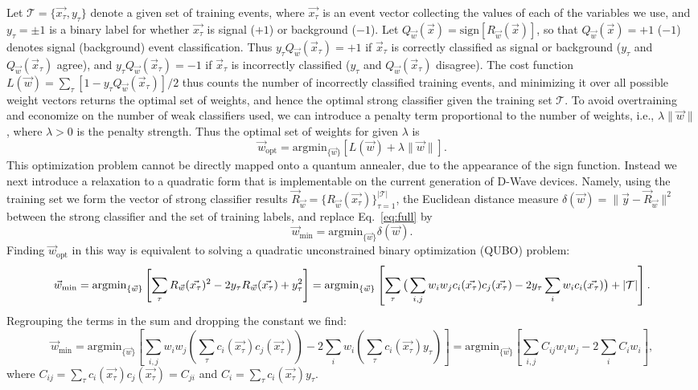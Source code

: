\documentclass[fleqn,10pt]{wlscirep}
\newcommand{\beq}{\begin{equation}}
\newcommand{\eeq}{\end{equation}}
\newcommand{\mc}{\mathcal}
\begin{document}
Let $\mc{T} = \{\vec{x_\tau}, y_\tau\}$ denote a given set of training events, where $\vec{x_\tau}$ is an event vector collecting the values of each of the variables we use, and $y_\tau =\pm 1$ is a binary label for whether $\vec{x_\tau}$ is signal ($+1$) or background ($-1$). Let $Q_{\vec{w}}(\vec{x}) = \mathrm{sign}[R_{\vec{w}}(\vec{x})]$, so that $Q_{\vec{w}}(\vec{x})=+1$ ($-1$) denotes signal (background) event classification. Thus $y_\tau Q_{\vec{w}}(\vec{x}_{\tau})=+1$ if $\vec{x}_{\tau}$ is correctly classified as signal or background ($y_\tau$ and $Q_{\vec{w}}(\vec{x}_{\tau})$ agree), and $y_\tau Q_{\vec{w}}(\vec{x}_{\tau})=-1$ if $\vec{x}_{\tau}$ is incorrectly classified ($y_\tau$ and $Q_{\vec{w}}(\vec{x}_{\tau})$ disagree). The cost function $L(\vec{w}) = \sum_{\tau} [1-y_\tau Q_{\vec{w}}(\vec{x}_{\tau})]/2$ thus counts the number of incorrectly classified training events, and minimizing it over all possible weight vectors returns the optimal set of weights, and hence the optimal strong classifier given the training set $\mc{T}$. To avoid overtraining and economize on the number of weak classifiers used, we can introduce a penalty term proportional to the number of weights, i.e., $\lambda \|\vec{w}\|$, where $\lambda>0$ is the penalty strength. Thus the optimal set of weights for given $\lambda$ is
\beq
\vec{w}_{\mathrm{opt}} = \mathrm{argmin}_{\{\vec{w}\}}\left[ L(\vec{w}) + \lambda \|\vec{w}\| \right] .
\label{eq:full}
\eeq
This optimization problem cannot be directly mapped onto a quantum annealer, due to the appearance of the sign function. 
Instead we next introduce a relaxation to a quadratic form that is implementable on the current generation of D-Wave devices. Namely, using the training set we form the vector of strong classifier results $\vec{R}_{\vec{w}} = \{R_{\vec{w}}(\vec{x_\tau})\}_{\tau=1}^{|\mc{T}|}$, the Euclidean distance measure $\delta(\vec{w})=\|\vec{y}-\vec{R}_{\vec{w}}\|^2$ between the strong classifier and the set of training labels, and replace Eq.~\eqref{eq:full} by
\beq
\vec{w}_{\min} = \mathrm{argmin}_{\{\vec{w}\}} \delta(\vec{w}) .
\eeq
Finding $\vec{w}_{\mathrm{opt}}$ in this way is equivalent to solving a quadratic unconstrained binary optimization (QUBO) problem:
\beq
\vec{w}_{\min}  = \mathrm{argmin}_{\{\vec{w}\}} 
 		\left[\sum_\tau R_{\vec{w}}(\vec{x_\tau})^2-2y_\tau R_{\vec{w}}(\vec{x_\tau}) + y_\tau^2 \right]
		=  \mathrm{argmin}_{\{\vec{w}\}} \left[\sum_\tau \big(\sum_{i,j} w_i w_j c_i(\vec{x_\tau}) c_j(\vec{x_\tau}) - 2 y_\tau \sum_{i} w_i c_i(\vec{x_\tau})\big) + \abs{\mc{T}} \right] .
\eeq
Regrouping the terms in the sum and dropping the constant we find:
\beq
\vec{w}_{\min}  = \mathrm{argmin}_{\{\vec{w}\}} 
 		\left[ \sum_{i,j} w_i w_j \left(\sum_\tau c_i(\vec{x_\tau})c_j(\vec{x_\tau})\right)  -2\sum_i w_i \left(\sum_\tau c_i(\vec{x_\tau})y_\tau\right) \right] =  \mathrm{argmin}_{\{\vec{w}\}} \left[ \sum_{i,j} C_{ij} w_i w_j - 2\sum_i C_i w_i \right] ,
		\label{eq:wopt1}
\eeq
where $C_{ij} = \sum_\tau c_i(\vec{x_\tau})c_j(\vec{x_\tau}) = C_{ji}$ and $C_i = \sum_\tau c_i(\vec{x_\tau}) y_\tau$. 
\end{document}
